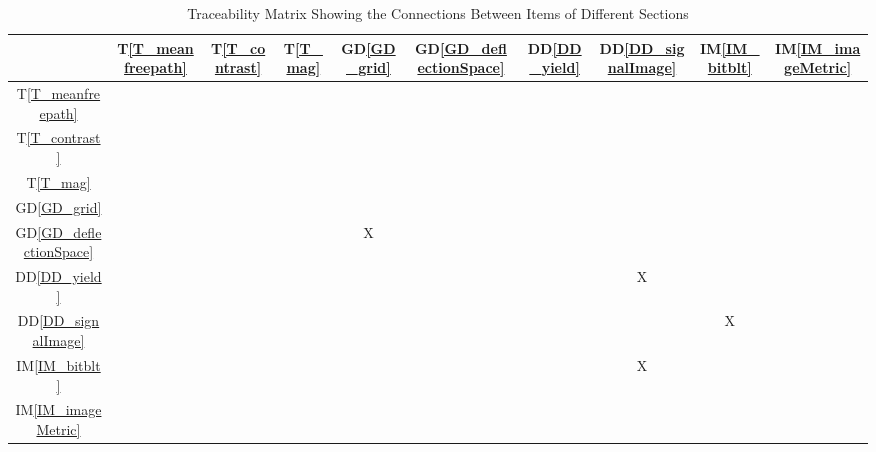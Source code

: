 \documentclass[12pt]{article}
\newcommand{\dref}[1]{GD\ref{#1}}
\newcommand{\ddref}[1]{DD\ref{#1}}
\newcommand{\tref}[1]{T\ref{#1}}
\newcommand{\iref}[1]{IM\ref{#1}}
\begin{document}
\begin{table}[h!]
\centering
\begin{tabular}{|c|c|c|c|c|c|c|c|c|c|}
\hline        
	& \tref{T_meanfreepath}
  & \tref{T_contrast}
  & \tref{T_mag}
  & \dref{GD_grid}
  & \dref{GD_deflectionSpace}
  & \ddref{DD_yield}
  & \ddref{DD_signalImage}
  & \iref{IM_bitblt}
  & \iref{IM_imageMetric}
\\ \hline
\tref{T_meanfreepath}       & & & & & & & & &  \\ \hline
\tref{T_contrast}           & & & & & & & & &  \\ \hline
\tref{T_mag}                & & & & & & & & &  \\ \hline
\dref{GD_grid}              & & & & & & & & &  \\ \hline
\dref{GD_deflectionSpace}   & & & &X& & & & &  \\ \hline
\ddref{DD_yield}            & & & & & & &X& &  \\ \hline
\ddref{DD_signalImage}      & & & & & & & &X&  \\ \hline
\iref{IM_bitblt}            & & & & & & &X& &  \\ \hline
\iref{IM_imageMetric}       & & & & & & & & &  \\ \hline
\end{tabular}
\caption{Traceability Matrix Showing the Connections Between Items of Different Sections}
\label{Table:trace}
\end{table}
\end{document}
